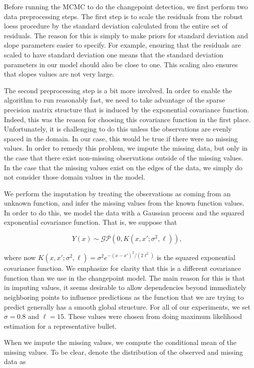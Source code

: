 \documentclass[12pt]{article}
\begin{document}
Before running the MCMC to do the changepoint detection, we first
perform two data preprocessing steps. The first step is to scale the
residuals from the robust loess procedure by the standard deviation
calculated from the entire set of residuals. The reason for this is
simply to make priors for standard deviation and slope parameters easier
to specify. For example, ensuring that the residuals are scaled to have
standard deviation one means that the standard deviation parameters in
our model should also be close to one. This scaling also ensures that
slopes values are not very large.

The second preprocessing step is a bit more involved. In order to enable
the algorithm to run reasonably fast, we need to take advantage of the
sparse precision matrix structure that is induced by the exponential
covariance function. Indeed, this was the reason for choosing this
covariance function in the first place. Unfortunately, it is challenging
to do this unless the observations are evenly spaced in the domain. In
our case, this would be true if there were no missing values. In order
to remedy this problem, we impute the missing data, but only in the case
that there exist non-missing observations outside of the missing values.
In the case that the missing values exist on the edges of the data, we
simply do not consider those domain values in the model.

We perform the imputation by treating the observations as coming from an
unknown function, and infer the missing values from the known function
values. In order to do this, we model the data with a Gaussian process
and the squared exponential covariance function. That is, we suppose
that

\[
Y(x) \sim \mathcal{GP}(0, K(x,x';\sigma^2, \ell)),
\]

\noindent where now
\(K(x,x';\sigma^2, \ell) = \sigma^2 e^{-(x - x')^2/(2\ell^2)}\) is the
squared exponential covariance function. We emphasize for clarity that
this is a different covariance function than we use in the changepoint
model. The main reason for this is that in imputing values, it seems
desirable to allow dependencies beyond immediately neighboring points to
influence predictions as the function that we are trying to predict
generally has a smooth global structure. For all of our experiments, we
set \(\sigma = 0.8\) and \(\ell = 15\). These values were chosen from
doing maximum likelihood estimation for a representative bullet.

When we impute the missing values, we compute the conditional mean of
the missing values. To be clear, denote the distribution of the observed
and missing data as
\end{document}
